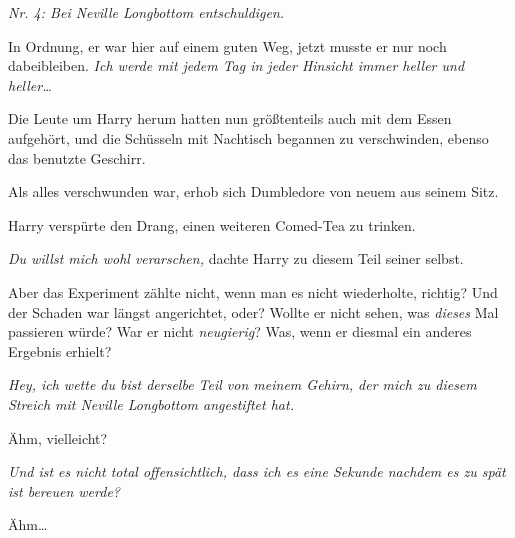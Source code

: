 \emph{Nr. 4: Bei Neville Longbottom entschuldigen.}

In Ordnung, er war hier auf einem guten Weg, jetzt musste er nur noch dabeibleiben. \emph{Ich werde mit jedem Tag in jeder Hinsicht immer heller und heller…}

Die Leute um Harry herum hatten nun größtenteils auch mit dem Essen aufgehört, und die Schüsseln mit Nachtisch begannen zu verschwinden, ebenso das benutzte Geschirr.

Als alles verschwunden war, erhob sich Dumbledore von neuem aus seinem Sitz.

Harry verspürte den Drang, einen weiteren Comed-Tea zu trinken.

\emph{Du \emph{willst} mich wohl verarschen,} dachte Harry zu diesem Teil seiner selbst.

Aber das Experiment zählte nicht, wenn man es nicht wiederholte, richtig? Und der Schaden war längst angerichtet, oder? Wollte er nicht sehen, was \emph{dieses} Mal passieren würde? War er nicht \emph{neugierig}? Was, wenn er diesmal ein anderes Ergebnis erhielt?

\emph{Hey, ich wette du bist derselbe Teil von meinem Gehirn, der mich zu diesem Streich mit Neville Longbottom angestiftet hat.}

Ähm, vielleicht?

\emph{Und ist es nicht total offensichtlich, dass ich es eine Sekunde nachdem es zu spät ist bereuen werde?}

Ähm…

